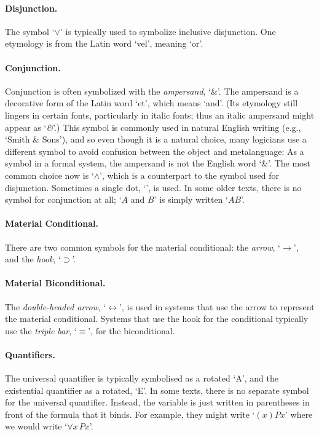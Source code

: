 \paragraph{Disjunction.} The symbol `$\vee$' is typically used to symbolize inclusive disjunction. One etymology is from the Latin word `vel', meaning `or'.%

\paragraph{Conjunction.}
Conjunction is often symbolized with the \emph{ampersand}, `{\&}'. The ampersand is a decorative form of the Latin word `et', which means `and'.  (Its etymology still lingers in certain fonts, particularly in italic fonts; thus an italic ampersand might appear as `\emph{\&}'.) This symbol is commonly used in natural English writing (e.g., `Smith \& Sons'), and so even though it is a natural choice, many logicians use a different symbol to avoid confusion between the object and metalanguage: As a symbol in a formal system, the ampersand is not the English word `\&'. The most common choice now is `$\wedge$', which is a counterpart to the symbol used for disjunction. Sometimes a single dot, `{\scriptsize\textbullet}', is used. In some older texts, there is no symbol for conjunction at all; `$A$ and $B$' is simply written `$AB$'.

\paragraph{Material Conditional.} There are two common symbols for the material conditional: the \emph{arrow}, `$\rightarrow$', and the \emph{hook}, `$\supset$'.

\paragraph{Material Biconditional.} The \emph{double-headed arrow}, `$\leftrightarrow$', is used in systems that use the arrow to represent the material conditional. Systems that use the hook for the conditional typically use the \emph{triple bar}, `$\equiv$', for the biconditional.

\paragraph{Quantifiers.} The universal quantifier is typically symbolised as a rotated `A', and the existential quantifier as a rotated, `E'. In some texts, there is no separate symbol for the universal quantifier. Instead, the variable is just written in parentheses in front of the formula that it binds. For example, they might write `$(x)Px$' where we would write `$\forall x\, Px$'.

